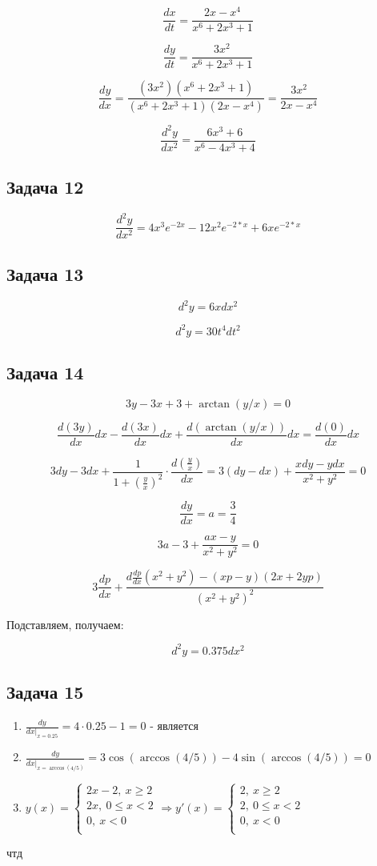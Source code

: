 \documentclass[a4paper,12pt]{article}
\begin{document}
\[
\frac{dx}{dt} = \frac{2x-x^4}{x^6+2x^3+1}
\]

\[
\frac{dy}{dt} = \frac{3x^2}{x^6+2x^3+1}
\]

\[
\frac{dy}{dx} = \frac{(3x^2)(x^6+2x^3+1)}{(x^6+2x^3+1)(2x-x^4)} = \frac{3x^2}{2x-x^4}
\]

\[
\frac{d^2y}{dx^2} = \frac{6x^3+6}{x^6-4x^3+4}
\]

\subsection{Задача 12}

\[
\frac{d^2y}{dx^2} = 4x^3e^{-2x} - 12x^2e^{-2*x} + 6xe^{-2*x}
\]

\subsection{Задача 13}

\[
d^2y = 6xdx^2
\]

\[
d^2y = 30t^4dt^2
\]

\subsection{Задача 14}

\[
3y-3x+3+\arctan(y/x) = 0
\]

\[
\frac{d(3y)}{dx}dx - \frac{d(3x)}{dx}dx + \frac{d(\arctan(y/x))}{dx}dx = \frac{d(0)}{dx}dx
\]

\[
3dy - 3dx + \frac{1}{1+(\frac{y}{x})^2}\cdot \frac{d(\frac{y}{x})}{dx} = 3(dy-dx) + \frac{xdy-ydx}{x^2+y^2} = 0
\]

\[
\frac{dy}{dx} = a = \frac{3}{4}
\]

\[
3a-3+\frac{ax-y}{x^2+y^2} = 0
\]

\[
3\frac{dp}{dx} + \frac{d\frac{dp}{dx}(x^2+y^2)-(xp-y)(2x+2yp)}{(x^2+y^2)^2}
\]

Подставляем, получаем:

\[
d^2y = 0.375dx^2
\]

\subsection{Задача 15}
\begin{enumerate}
    \item $\frac{dy}{dx|_{x=0.25}} = 4\cdot 0.25 - 1 = 0$ - является
    \item $\frac{dy}{dx|_{x=\arccos(4/5)}} = 3\cos(\arccos(4/5)) -4\sin(\arccos(4/5)) = 0$
    \item $y(x) = \begin{cases}
        2x-2, \ x\ge 2 \\
        2x, \ 0 \le x < 2 \\
        0, \ x < 0\\
    \end{cases} \Rightarrow y'(x) = \begin{cases}
        2, \ x\ge 2 \\
        2, \ 0 \le x < 2 \\
        0, \ x < 0\\
    \end{cases}$
\end{enumerate}
чтд
\end{document}
